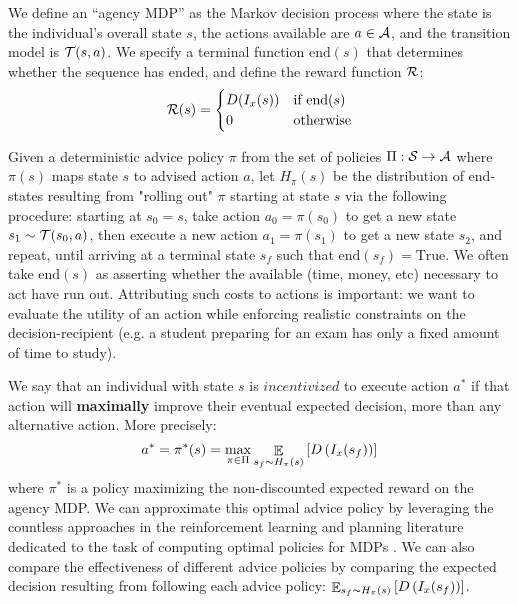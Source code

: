 We define an ``agency MDP'' as the Markov decision process where the state is the individual's overall state $s$, the actions available are $a \in \mathcal{A}$, and the transition model is $\mathcal{T}(s, a)$. We specify a terminal function $\text{end}(s)$ that determines whether the sequence has ended, and define the reward function $\mathcal{R}$:
\begin{equation}
    \mathcal{R}(s) = 
    \begin{cases}
    D(I_x(s)) & \text{if}~ \text{end}(s) \\
    0 & \text{otherwise}
    \end{cases}
\end{equation}

Given a deterministic advice policy $\pi$ from the set of policies $\Pi: \mathcal{S} \rightarrow \mathcal{A}$ where $\pi(s)$ maps state $s$ to advised action $a$, let $H_\pi(s)$ be the distribution of end-states resulting from "rolling out" $\pi$ starting at state $s$ via the following procedure: starting at $s_0=s$, take action $a_0 = \pi(s_0)$ to get a new state $s_1 \sim \mathcal{T}(s_0, a)$, then execute a new action $a_1=\pi(s_1)$ to get a new state $s_2$, and repeat, until arriving at a terminal state $s_f$ such that $\text{end}(s_f)=\text{True}$. We often take $\text{end}(s)$ as asserting whether the available  (time, money, etc) necessary to act have run out. Attributing such costs to actions is important: we want to evaluate the utility of an action while enforcing realistic constraints on the decision-recipient (e.g. a student preparing for an exam has only a fixed amount of time to study).

We say that an individual with state $s$ is $\textit{incentivized}$ to execute action $a^*$ if that action will \textbf{maximally} improve their eventual expected decision, more than any alternative action. More precisely:
\begin{equation}
\label{eq:incentivequality}
    a^* = \pi^*(s) = \max_{\pi \in \Pi} \mathop{\mathbb{E}}_{s_f \sim H_\pi(s)} \left [D\left(I_x(s_f)\right)\right ]
\end{equation}
where $\pi^*$ is a policy maximizing the non-discounted expected reward on the agency MDP. We can approximate this optimal advice policy by leveraging the countless approaches in the reinforcement learning and planning literature dedicated to the task of computing optimal policies for MDPs \cite{kaelbling1996reinforcement, kolobov2012planning}.
We can also compare the effectiveness of different advice policies by comparing the expected decision resulting from following each advice policy: $\mathop{\mathbb{E}}_{s_f \sim H_\pi(s)} \left [D\left(I_x(s_f)\right)\right ]$.

